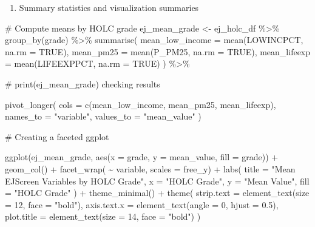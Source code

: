 \documentclass[
  letterpaper,
  DIV=11,
  numbers=noendperiod]{scrartcl}
\newenvironment{Shaded}{\begin{snugshade}}{\end{snugshade}}
\newcommand{\AttributeTok}[1]{\textcolor[rgb]{0.40,0.45,0.13}{#1}}
\newcommand{\CommentTok}[1]{\textcolor[rgb]{0.37,0.37,0.37}{#1}}
\newcommand{\ConstantTok}[1]{\textcolor[rgb]{0.56,0.35,0.01}{#1}}
\newcommand{\DecValTok}[1]{\textcolor[rgb]{0.68,0.00,0.00}{#1}}
\newcommand{\FloatTok}[1]{\textcolor[rgb]{0.68,0.00,0.00}{#1}}
\newcommand{\FunctionTok}[1]{\textcolor[rgb]{0.28,0.35,0.67}{#1}}
\newcommand{\NormalTok}[1]{\textcolor[rgb]{0.00,0.23,0.31}{#1}}
\newcommand{\OtherTok}[1]{\textcolor[rgb]{0.00,0.23,0.31}{#1}}
\newcommand{\SpecialCharTok}[1]{\textcolor[rgb]{0.37,0.37,0.37}{#1}}
\newcommand{\StringTok}[1]{\textcolor[rgb]{0.13,0.47,0.30}{#1}}
\providecommand{\tightlist}{%
  \setlength{\itemsep}{0pt}\setlength{\parskip}{0pt}}\usepackage{longtable,booktabs,array}
\begin{document}
\begin{enumerate}
\def\labelenumi{\arabic{enumi}.}
\setcounter{enumi}{2}
\tightlist
\item
  Summary statistics and visualization summaries
\end{enumerate}

\begin{Shaded}
\begin{Highlighting}[]
\CommentTok{\# Compute means by HOLC grade}
\NormalTok{ej\_mean\_grade }\OtherTok{\textless{}{-}}\NormalTok{ ej\_holc\_df }\SpecialCharTok{\%\textgreater{}\%} 
  \FunctionTok{group\_by}\NormalTok{(grade) }\SpecialCharTok{\%\textgreater{}\%} 
  \FunctionTok{summarise}\NormalTok{(}
    \AttributeTok{mean\_low\_income =} \FunctionTok{mean}\NormalTok{(LOWINCPCT, }\AttributeTok{na.rm =} \ConstantTok{TRUE}\NormalTok{),}
    \AttributeTok{mean\_pm25 =} \FunctionTok{mean}\NormalTok{(P\_PM25, }\AttributeTok{na.rm =} \ConstantTok{TRUE}\NormalTok{),}
    \AttributeTok{mean\_lifeexp =} \FunctionTok{mean}\NormalTok{(LIFEEXPPCT, }\AttributeTok{na.rm =} \ConstantTok{TRUE}\NormalTok{)}
\NormalTok{  ) }\SpecialCharTok{\%\textgreater{}\%} 
  
\CommentTok{\# print(ej\_mean\_grade) checking results}
  
\FunctionTok{pivot\_longer}\NormalTok{(}
    \AttributeTok{cols =} \FunctionTok{c}\NormalTok{(mean\_low\_income, mean\_pm25, mean\_lifeexp),}
    \AttributeTok{names\_to =} \StringTok{"variable"}\NormalTok{,}
    \AttributeTok{values\_to =} \StringTok{"mean\_value"}
\NormalTok{)}


\CommentTok{\# Creating a faceted ggplot}

\FunctionTok{ggplot}\NormalTok{(ej\_mean\_grade, }\FunctionTok{aes}\NormalTok{(}\AttributeTok{x =}\NormalTok{ grade, }\AttributeTok{y =}\NormalTok{ mean\_value, }\AttributeTok{fill =}\NormalTok{ grade)) }\SpecialCharTok{+}
  \FunctionTok{geom\_col}\NormalTok{() }\SpecialCharTok{+}
  \FunctionTok{facet\_wrap}\NormalTok{( }\SpecialCharTok{\textasciitilde{}}\NormalTok{ variable, }\AttributeTok{scales =} \StringTok{\textquotesingle{}free\_y\textquotesingle{}}\NormalTok{) }\SpecialCharTok{+}
  \FunctionTok{labs}\NormalTok{(}
  \AttributeTok{title =} \StringTok{"Mean EJScreen Variables by HOLC Grade"}\NormalTok{,}
  \AttributeTok{x =} \StringTok{"HOLC Grade"}\NormalTok{,}
  \AttributeTok{y =} \StringTok{"Mean Value"}\NormalTok{,}
  \AttributeTok{fill =} \StringTok{"HOLC Grade"}
\NormalTok{  ) }\SpecialCharTok{+}
  \FunctionTok{theme\_minimal}\NormalTok{() }\SpecialCharTok{+}
  \FunctionTok{theme}\NormalTok{(}
    \AttributeTok{strip.text =} \FunctionTok{element\_text}\NormalTok{(}\AttributeTok{size =} \DecValTok{12}\NormalTok{, }\AttributeTok{face =} \StringTok{"bold"}\NormalTok{),}
    \AttributeTok{axis.text.x =} \FunctionTok{element\_text}\NormalTok{(}\AttributeTok{angle =} \DecValTok{0}\NormalTok{, }\AttributeTok{hjust =} \FloatTok{0.5}\NormalTok{),}
    \AttributeTok{plot.title =} \FunctionTok{element\_text}\NormalTok{(}\AttributeTok{size =} \DecValTok{14}\NormalTok{, }\AttributeTok{face =} \StringTok{"bold"}\NormalTok{)}
\NormalTok{  )}
\end{Highlighting}
\end{Shaded}
\end{document}
